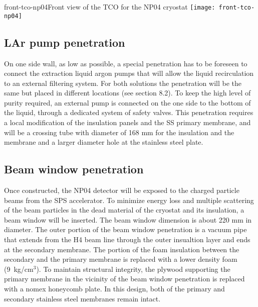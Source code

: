 \begin{cdrfigure}{front-tco-np04}{Front view of the TCO for the NP04 cryostat}
  \texttt{[image: front-tco-np04]}
\end{cdrfigure}


\subsection{LAr pump penetration}

On one side wall, as low as possible, a special penetration has to be foreseen to connect the extraction liquid argon pumps that will allow the liquid recirculation to an external filtering system. For both solutions the penetration will be the same but placed in different locations (see section 8.2).
To keep the high level of purity required, an external pump is connected on the one side to the bottom of the liquid, through a dedicated system of safety valves. This penetration requires a local modification of the insulation panels and the SS primary membrane, and will be a crossing tube with diameter of 168 mm for the insulation and the membrane and a larger diameter hole at the stainless steel plate.

\subsection{Beam window penetration}

Once constructed, the NP04 detector will be exposed to the charged
particle beams from the SPS accelerator. To minimize energy loss and
multiple scattering of the beam particles in the dead material of the
cryostat and its insulation, a beam window will be inserted.  The beam
window dimension is about 220 mm in diameter. The outer portion of the
beam window penetration is a vacuum pipe that extends from the H4 beam
line through the outer insualtion layer and ends at the secondary
membrane. The portion of the foam insulation between the secondary and
the primary membrane is replaced with a lower density foam
(9~kg/cm$^3$). 
To maintain structural integrity, the plywood supporting
the primary membrane in the vicinity of the beam window penetration is
replaced with a nomex honeycomb plate. In this design, both of the
primary and secondary stainless steel membranes remain intact.


